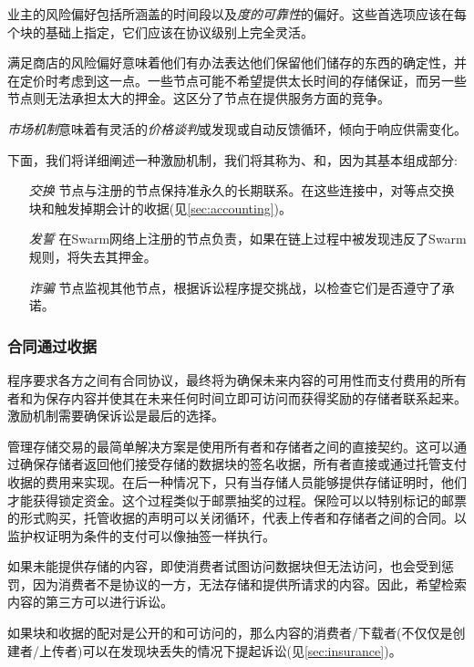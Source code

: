 业主的风险偏好包括所涵盖的时间段以及\emph{度的可靠性}的偏好。这些首选项应该在每个块的基础上指定，它们应该在协议级别上完全灵活。

满足商店的风险偏好意味着他们有办法表达他们保留他们储存的东西的确定性，并在定价时考虑到这一点。一些节点可能不希望提供太长时间的存储保证，而另一些节点则无法承担太大的押金。这区分了节点在提供服务方面的竞争。

\emph{市场机制}意味着有灵活的\emph{价格谈判}或发现或自动反馈循环，倾向于响应供需变化。

下面，我们将详细阐述一种激励机制，我们将其称为、和，因为其基本组成部分:

\begin{itemize}
\item[\emph{交换}]
  节点与注册的节点保持准永久的长期联系。在这些连接中，对等点交换块和触发掉期会计的收据(见\ref{sec:accounting})。
  
\item[\emph{发誓}]
  在Swarm网络上注册的节点负责，如果在链上过程中被发现违反了Swarm规则，将失去其押金。

\item[\emph{诈骗}]
  节点监视其他节点，根据诉讼程序提交挑战，以检查它们是否遵守了承诺。

\end{itemize}

\subsubsection{合同通过收据}

程序要求各方之间有合同协议，最终将为确保未来内容的可用性而支付费用的所有者和为保存内容并使其在未来任何时间立即可访问而获得奖励的存储者联系起来。激励机制需要确保诉讼是最后的选择。

管理存储交易的最简单解决方案是使用所有者和存储者之间的直接契约。这可以通过确保存储者返回他们接受存储的数据块的签名收据，所有者直接或通过托管支付收据的费用来实现。在后一种情况下，只有当存储人员能够提供存储证明时，他们才能获得锁定资金。这个过程类似于邮票抽奖的过程。保险可以以特别标记的邮票的形式购买，托管收据的声明可以关闭循环，代表上传者和存储者之间的合同。以监护权证明为条件的支付可以像抽签一样执行。

如果未能提供存储的内容，即使消费者试图访问数据块但无法访问，也会受到惩罚，因为消费者不是协议的一方，无法存储和提供所请求的内容。因此，希望检索内容的第三方可以进行诉讼。

如果块和收据的配对是公开的和可访问的，那么内容的消费者/下载者(不仅仅是创建者/上传者)可以在发现块丢失的情况下提起诉讼(见\ref{sec:insurance})。 

